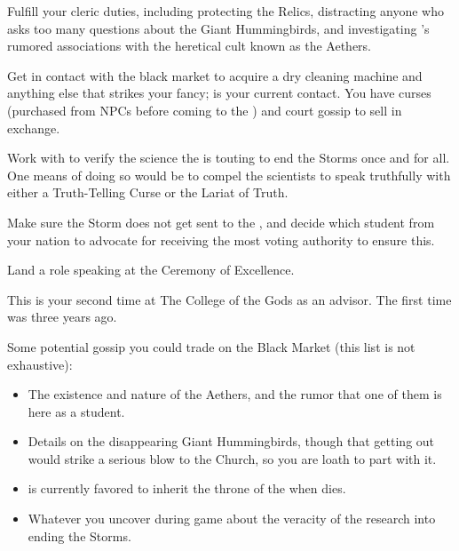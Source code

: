 \documentclass[char]{GL2020}
\begin{document}
\begin{itemz}
	\item Fulfill your cleric duties, including protecting the Relics, distracting anyone who asks too many questions about the Giant Hummingbirds, and investigating \cDisney{}'s rumored associations with the heretical cult known as the Aethers.
	\item Get in contact with the black market to acquire a dry cleaning machine and anything else that strikes your fancy; \cChupSecond{} is your current contact. You have curses (purchased from NPCs before coming to the \pSchool{}) and court gossip to sell in exchange.
	\item Work with \cCurse{} to verify the science the \pTech{} is touting to end the Storms once and for all. One means of doing so would be to compel the scientists to speak truthfully with either a Truth-Telling Curse or the Lariat of Truth.
	\item Make sure the Storm does not get sent to the \pFarm{}, and decide which student from your nation to advocate for receiving the most voting authority to ensure this.
	\item Land a role speaking at the Ceremony of Excellence.
\end{itemz}

\begin{itemz}[Notes]
	\item This is your second time at The College of the Gods as an advisor. The first time was three years ago. 
	\item Some potential gossip you could trade on the Black Market (this list is not exhaustive): 
	\begin{itemize}
		\item The existence and nature of the Aethers, and the rumor that one of them is here as a student.
		\item Details on the disappearing Giant Hummingbirds, though that getting out would strike a serious blow to the Church, so you are loath to part with it.
		\item \cPrince{} is currently favored to inherit the throne of the \pFarm{} when \cQueen{\their} \cQueen{\Majesty} dies.
		\item Whatever you uncover during game about the veracity of the research into ending the Storms.
	\end{itemize}
\end{itemz}
\end{document}
